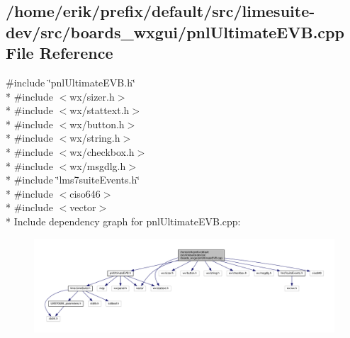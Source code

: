 \subsection{/home/erik/prefix/default/src/limesuite-\/dev/src/boards\+\_\+wxgui/pnl\+Ultimate\+E\+VB.cpp File Reference}
\label{pnlUltimateEVB_8cpp}
{\ttfamily \#include \char`\"{}pnl\+Ultimate\+E\+V\+B.\+h\char`\"{}}\\*
{\ttfamily \#include $<$wx/sizer.\+h$>$}\\*
{\ttfamily \#include $<$wx/stattext.\+h$>$}\\*
{\ttfamily \#include $<$wx/button.\+h$>$}\\*
{\ttfamily \#include $<$wx/string.\+h$>$}\\*
{\ttfamily \#include $<$wx/checkbox.\+h$>$}\\*
{\ttfamily \#include $<$wx/msgdlg.\+h$>$}\\*
{\ttfamily \#include \char`\"{}lms7suite\+Events.\+h\char`\"{}}\\*
{\ttfamily \#include $<$ciso646$>$}\\*
{\ttfamily \#include $<$vector$>$}\\*
Include dependency graph for pnl\+Ultimate\+E\+V\+B.\+cpp\+:
\nopagebreak
\begin{figure}[H]
\begin{center}
\leavevmode
\includegraphics[width=350pt]{d8/d00/pnlUltimateEVB_8cpp__incl}
\end{center}
\end{figure}
